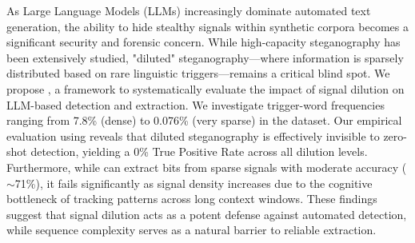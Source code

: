 As Large Language Models (LLMs) increasingly dominate automated text generation, the ability to hide stealthy signals within synthetic corpora becomes a significant security and forensic concern. While high-capacity steganography has been extensively studied, "diluted" steganography—where information is sparsely distributed based on rare linguistic triggers—remains a critical blind spot. We propose \ours, a framework to systematically evaluate the impact of signal dilution on LLM-based detection and extraction. We investigate trigger-word frequencies ranging from 7.8\% (dense) to 0.076\% (very sparse) in the \wikitext dataset. Our empirical evaluation using \gpt reveals that diluted steganography is effectively invisible to zero-shot detection, yielding a 0\% True Positive Rate across all dilution levels. Furthermore, while \gpt can extract bits from sparse signals with moderate accuracy ($\sim$71\%), it fails significantly as signal density increases due to the cognitive bottleneck of tracking patterns across long context windows. These findings suggest that signal dilution acts as a potent defense against automated detection, while sequence complexity serves as a natural barrier to reliable extraction.
